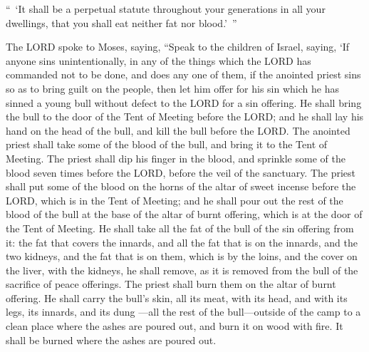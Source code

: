 \myverse{}“ ‘It shall be a perpetual statute throughout your generations
in all your dwellings, that you shall eat neither fat nor blood.’ ”


\mychapter{} \myverse*{}The LORD spoke to Moses, saying,
\myverse{}“Speak to the children of Israel, saying, ‘If anyone sins unintentionally, in
any of the things which the LORD has commanded not to be done, and does any one of them,
\myverse{}if the anointed priest sins so as to bring guilt on the people, then let him
offer for his sin which he has sinned a young bull without defect to the LORD for a sin offering.
\myverse{}He shall bring the bull to the door of the Tent of Meeting before the LORD;
and he shall lay his hand on the head of the bull, and kill the bull before the LORD.
\myverse{}The anointed priest shall take some of the blood of the bull, and bring it to
the Tent of Meeting.
\myverse{}The priest shall dip his finger in the blood, and sprinkle some of the blood
seven times before the LORD, before the veil of the sanctuary.
\myverse{}The priest shall put some of the blood on the horns of the altar of sweet incense
before the LORD, which is in the Tent of Meeting; and he shall pour out the rest of the blood of the bull
at the base of the altar of burnt offering, which is at the door of the Tent of Meeting.
\myverse{}He shall take all the fat of the bull of the sin offering from it: the fat that
covers the innards, and all the fat that is on the innards,
\myverse{}and the two kidneys, and the fat that is on them, which is by the loins, and
the cover on the liver, with the kidneys, he shall remove,
\myverse{}as it is removed from the bull of the sacrifice of peace offerings. The priest
shall burn them on the altar of burnt offering.
\myverse{}He shall carry the bull’s skin, all its meat, with its head, and with its
legs, its innards, and its dung
\myverse{}—all the rest of the bull—outside of the camp to a clean place where the ashes
are poured out, and burn it on wood with fire. It shall be burned where the ashes are poured out.


